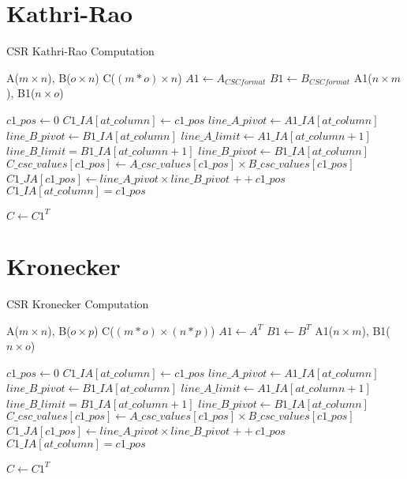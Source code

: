 \documentclass{article}
\begin{document}
\section{Kathri-Rao}
\begin{algorithm}
\caption{CSR Kathri-Rao Computation}\label{krao}
\begin{algorithmic}[1]

\Require A($m\times n$), B($o\times n$)
\Ensure C($(m * o) \times n$)
\Statex
\State $A1 \gets A_{CSC format}$
\State $B1 \gets B_{CSC format}$
\Statex
\Require A1($n\times m$), B1($n\times o$)
\Statex

\State $c1\_pos \gets 0$
    \State $C1\_IA[at\_column] \gets c1\_pos$
    \State $line\_A\_pivot \gets A1\_IA[at\_column]$
    \State $line\_B\_pivot \gets B1\_IA[at\_column]$
    \State $line\_A\_limit \gets A1\_IA[at\_column+1]$
    \State $line\_B\_limit = B1\_IA[at\_column+1]$
    \Statex
		\State $line\_B\_pivot \gets B1\_IA[at\_column]$
			\State $C\_csc\_values[c1\_pos]  \gets A\_csc\_values[c1\_pos] \times B\_csc\_values[c1\_pos]$
			\State $C1\_JA[c1\_pos] \gets line\_A\_pivot \times line\_B\_pivot$
			\State $++c1\_pos$
		\EndFor
	\EndFor
\EndFor
\Statex
\State $C1\_IA[at\_column]=c1\_pos$

\Statex
\State $C \gets C1^{T}$

\end{algorithmic}
\end{algorithm}


\newpage
\section{Kronecker}
\begin{algorithm}
\caption{CSR Kronecker Computation}\label{kron}
\begin{algorithmic}[1]

\Require A($m\times n$), B($o\times p$)
\Ensure C($(m * o) \times (n * p)$)
\Statex
\State $A1 \gets A^{T}$
\State $B1 \gets B^{T}$
\Statex
\Require A1($n\times m$), B1($n\times o$)
\Statex

\State $c1\_pos \gets 0$
    \State $C1\_IA[at\_column] \gets c1\_pos$
    \State $line\_A\_pivot \gets A1\_IA[at\_column]$
    \State $line\_B\_pivot \gets B1\_IA[at\_column]$
    \State $line\_A\_limit \gets A1\_IA[at\_column+1]$
    \State $line\_B\_limit = B1\_IA[at\_column+1]$
    \Statex
		\State $line\_B\_pivot \gets B1\_IA[at\_column]$
			\State $C\_csc\_values[c1\_pos]  \gets A\_csc\_values[c1\_pos] \times B\_csc\_values[c1\_pos]$
			\State $C1\_JA[c1\_pos] \gets line\_A\_pivot \times line\_B\_pivot$
			\State $++c1\_pos$
		\EndFor
	\EndFor
\EndFor
\Statex
\State $C1\_IA[at\_column]=c1\_pos$

\Statex
\State $C \gets C1^{T}$

\end{algorithmic}
\end{algorithm}
\end{document}
